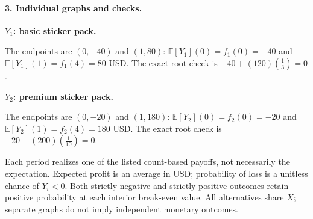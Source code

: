\clearpage\paragraph{3. Individual graphs and checks.}
\textbf{$Y_1$: basic sticker pack.}
\begin{center}\end{center}
The endpoints are $(0,-40)$ and $(1,80)$: $\mathbb E[Y_1](0)=f_1(0)=-40$ and
$\mathbb E[Y_1](1)=f_1(4)=80$ USD.
The exact root check is $-40+(120)(\frac{1}{3})=0$.
\par\medskip
\textbf{$Y_2$: premium sticker pack.}
\begin{center}\end{center}
The endpoints are $(0,-20)$ and $(1,180)$: $\mathbb E[Y_2](0)=f_2(0)=-20$ and
$\mathbb E[Y_2](1)=f_2(4)=180$ USD.
The exact root check is $-20+(200)(\frac{1}{10})=0$.
\par\medskip
Each period realizes one of the listed count-based payoffs, not necessarily the expectation.
Expected profit is an average in USD; probability of loss is a unitless chance of $Y_i<0$.
Both strictly negative and strictly positive outcomes retain positive probability at each interior break-even value.
All alternatives share $X$; separate graphs do not imply independent monetary outcomes.
\clearpage
